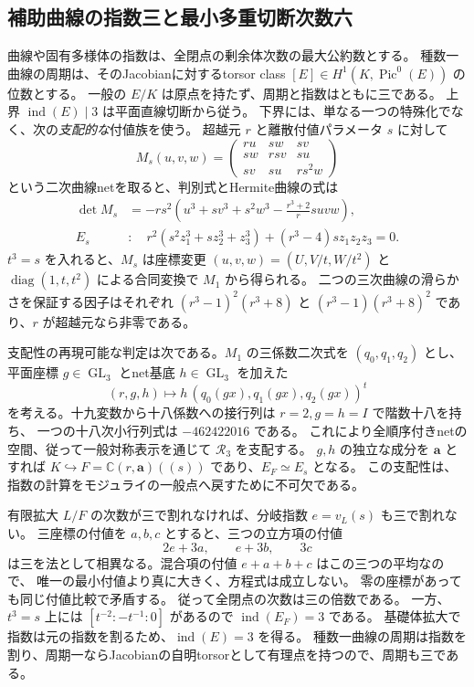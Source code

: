 \subsection{補助曲線の指数三と最小多重切断次数六}
\label{subsec:notes-index-v27}

曲線や固有多様体の指数は、全閉点の剰余体次数の最大公約数とする。
種数一曲線の周期は、そのJacobianに対するtorsor class
$[E]\in H^1(K,\operatorname{Pic}^0(E))$ の位数とする。
一般の $E/K$ は原点を持たず、周期と指数はともに三である。
上界 $\operatorname{ind}(E)\mid3$ は平面直線切断から従う。
下界には、単なる一つの特殊化でなく、次の\emph{支配的な}付値族を使う。
超越元 $r$ と離散付値パラメータ $s$ に対して
\[
 M_s(u,v,w)=\begin{pmatrix}
 ru&sw&sv\\sw&rsv&su\\sv&su&rs^2w
 \end{pmatrix}
\]
という二次曲線netを取ると、判別式とHermite曲線の式は
\begin{align*}
 \det M_s&=-rs^2\left(u^3+sv^3+s^2w^3-\frac{r^3+2}{r}suvw\right),\\
 E_s&:\quad r^2(s^2z_1^3+sz_2^3+z_3^3)+(r^3-4)sz_1z_2z_3=0.
\end{align*}
$t^3=s$ を入れると、$M_s$ は座標変更 $(u,v,w)=(U,V/t,W/t^2)$ と
$\operatorname{diag}(1,t,t^2)$ による合同変換で $M_1$ から得られる。
二つの三次曲線の滑らかさを保証する因子はそれぞれ
$(r^3-1)^2(r^3+8)$ と $(r^3-1)(r^3+8)^2$ であり、$r$ が超越元なら非零である。

支配性の再現可能な判定は次である。$M_1$ の三係数二次式を $(q_0,q_1,q_2)$ とし、
平面座標 $g\in\operatorname{GL}_3$ とnet基底 $h\in\operatorname{GL}_3$ を加えた
\[
 (r,g,h)\longmapsto h\,(q_0(gx),q_1(gx),q_2(gx))^t
\]
を考える。十九変数から十八係数への接行列は $r=2,g=h=I$ で階数十八を持ち、
一つの十八次小行列式は $-462422016$ である。
これにより全順序付きnetの空間、従って一般対称表示を通じて $\mathcal R_3$ を支配する。
$g,h$ の独立な成分を $\mathbf a$ とすれば
$K\hookrightarrow F=\mathbb C(r,\mathbf a)((s))$ であり、$E_F\simeq E_s$ となる。
この支配性は、指数の計算をモジュライの一般点へ戻すために不可欠である。

有限拡大 $L/F$ の次数が三で割れなければ、分岐指数 $e=v_L(s)$ も三で割れない。
三座標の付値を $a,b,c$ とすると、三つの立方項の付値
\[
 2e+3a,\qquad e+3b,\qquad3c
\]
は三を法として相異なる。混合項の付値 $e+a+b+c$ はこの三つの平均なので、
唯一の最小付値より真に大きく、方程式は成立しない。
零の座標があっても同じ付値比較で矛盾する。
従って全閉点の次数は三の倍数である。
一方、$t^3=s$ 上には $[t^{-2}:-t^{-1}:0]$ があるので $\operatorname{ind}(E_F)=3$ である。
基礎体拡大で指数は元の指数を割るため、$\operatorname{ind}(E)=3$ を得る。
種数一曲線の周期は指数を割り、周期一ならJacobianの自明torsorとして有理点を持つので、周期も三である。

